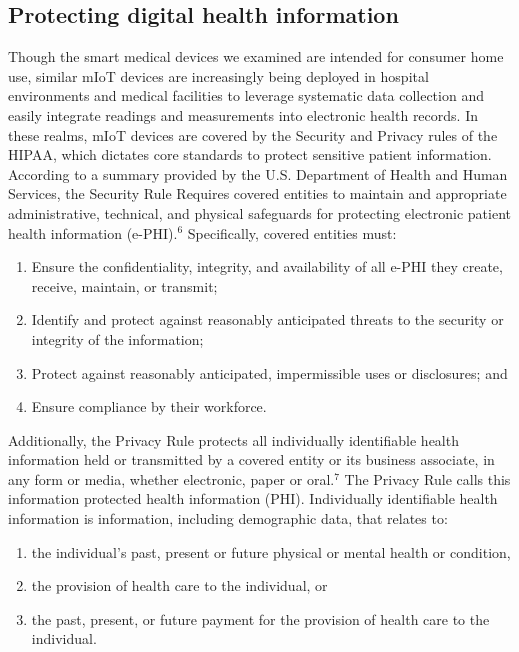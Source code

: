 \subsection{Protecting digital health information}
Though the smart medical devices we examined are intended for consumer home use, similar mIoT devices are increasingly being deployed in hospital environments and medical facilities to leverage systematic data collection and easily integrate readings and measurements into electronic health records. In these realms, mIoT devices are covered by the Security and Privacy rules of the HIPAA, which dictates core standards to protect sensitive patient information. According to a summary provided by the U.S. Department of Health and Human Services, the Security Rule Requires covered entities to maintain and appropriate administrative, technical, and physical safeguards for protecting electronic patient health information (e-PHI).$^6$ Specifically, covered entities must:

\begin{enumerate}
  \item Ensure the confidentiality, integrity, and availability of all e-PHI they create, receive, maintain, or transmit;
  \item Identify and protect against reasonably anticipated threats to the security or integrity of the information;
  \item Protect against reasonably anticipated, impermissible uses or disclosures; and
  \item Ensure compliance by their workforce. 
\end{enumerate}

Additionally, the Privacy Rule protects all individually identifiable health information held or transmitted by a covered entity or its business associate, in any form or media, whether electronic, paper or oral.$^7$ The Privacy Rule calls this information protected health information (PHI). Individually identifiable health information is information, including demographic data, that relates to:

\begin{enumerate}
  \item the individual's past, present or future physical or mental health or condition,
  \item the provision of health care to the individual, or
  \item the past, present, or future payment for the provision of health care to the individual.
\end{enumerate}

